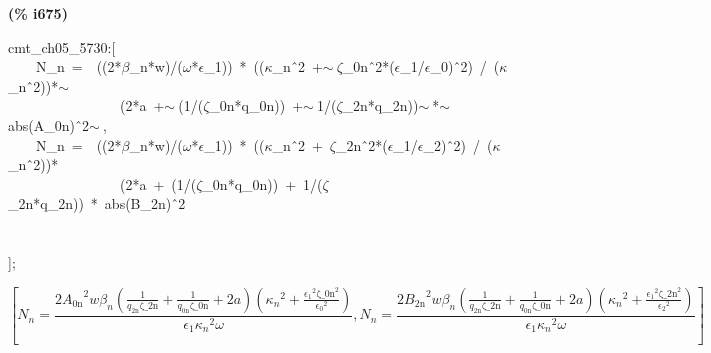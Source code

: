 \documentclass[fleqn]{article}
\begin{document}
\noindent
\begin{minipage}[t]{4.000000em}\color{red}\bfseries
(\% i675)	
\end{minipage}
\begin{minipage}[t]{\textwidth}\color{blue}
cmt\_ch05\_5730:[\\
\ \ \ \ N\_n\ =\ \ ((2*\ensuremath{\beta}\_n*w)/(\ensuremath{\omega}*\ensuremath{\epsilon}\_1))\ *\ ((\ensuremath{\kappa}\_n\^\ 2\ +\ensuremath{\sim\ }\ensuremath{\zeta}\_0n\^\ 2*(\ensuremath{\epsilon}\_1/\ensuremath{\epsilon}\_0)\^\ 2)\ /\ (\ensuremath{\kappa}\_n\^\ 2))*\ensuremath{\sim\ }\\
\ \ \ \ \ \ \ \ \ \ \ \ \ \ \ \ (2*a\ +\ensuremath{\sim\ }(1/(\ensuremath{\zeta}\_0n*q\_0n))\ +\ensuremath{\sim\ }1/(\ensuremath{\zeta}\_2n*q\_2n))\ensuremath{\sim\ }*\ensuremath{\sim\ }abs(A\_0n)\^\ 2\ensuremath{\sim\ },\\
\ \ \ \ N\_n\ =\ \ ((2*\ensuremath{\beta}\_n*w)/(\ensuremath{\omega}*\ensuremath{\epsilon}\_1))\ *\ ((\ensuremath{\kappa}\_n\^\ 2\ +\ \ensuremath{\zeta}\_2n\^\ 2*(\ensuremath{\epsilon}\_1/\ensuremath{\epsilon}\_2)\^\ 2)\ /\ (\ensuremath{\kappa}\_n\^\ 2))*\ \\
\ \ \ \ \ \ \ \ \ \ \ \ \ \ \ \ (2*a\ +\ (1/(\ensuremath{\zeta}\_0n*q\_0n))\ +\ 1/(\ensuremath{\zeta}\_2n*q\_2n))\ *\ abs(B\_2n)\^\ 2\ \\
\\
\ \ \ \ \\
];
\end{minipage}
\[\displaystyle \tag{\% o675} 
\operatorname{[}{N_n}=\frac{2 {{{A_{\ensuremath{\mathrm{0n}}}}}^{2}} w {{\beta }_n} \left( \frac{1}{{q_{\ensuremath{\mathrm{2n}}}} \ensuremath{\mathrm{\zeta \_ 2n}}}+\frac{1}{{q_{\ensuremath{\mathrm{0n}}}} \ensuremath{\mathrm{\zeta \_ 0n}}}+2 a\right)  \left( {{{{\kappa }_n}}^{2}}+\frac{{{{{\epsilon }_1}}^{2}} {{\ensuremath{\mathrm{\zeta \_ 0n}}}^{2}}}{{{{{\epsilon }_0}}^{2}}}\right) }{{{\epsilon }_1} {{{{\kappa }_n}}^{2}} \omega }\operatorname{,}{N_n}=
\frac{2 {{{B_{\ensuremath{\mathrm{2n}}}}}^{2}} w {{\beta }_n} \left( \frac{1}{{q_{\ensuremath{\mathrm{2n}}}} \ensuremath{\mathrm{\zeta \_ 2n}}}+\frac{1}{{q_{\ensuremath{\mathrm{0n}}}} \ensuremath{\mathrm{\zeta \_ 0n}}}+2 a\right)  \left( {{{{\kappa }_n}}^{2}}+\frac{{{{{\epsilon }_1}}^{2}} {{\ensuremath{\mathrm{\zeta \_ 2n}}}^{2}}}{{{{{\epsilon }_2}}^{2}}}\right) }{{{\epsilon }_1} {{{{\kappa }_n}}^{2}} \omega }\operatorname{]}\mbox{}
\]
\end{document}
